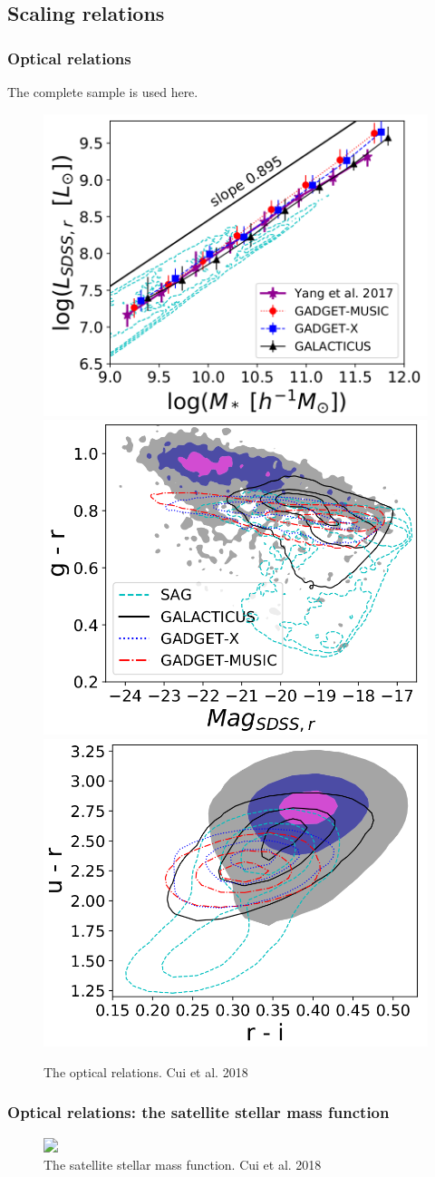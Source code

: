 \documentclass[aspectratio=1610]{beamer}
\begin{document}
\subsection{Scaling relations}
\begin{frame}
  \frametitle{Optical relations}
  The complete sample is used here.
  \begin{figure}
    \includegraphics[width=0.33\linewidth]{Optical-relation1}
    \includegraphics[width=0.32\linewidth]{Optical-relation2}
    \includegraphics[width=0.32\linewidth]{Optical-relation3}
    \vspace{-0.3cm}
    \caption{The optical relations. Cui et al. 2018}
  \end{figure}
\end{frame}
\begin{frame}
  \frametitle{Optical relations: the satellite stellar mass function}
  \begin{figure}
    \includegraphics<1>[width=0.7\linewidth]{Ssmf}
    \vspace{-0.6cm}
    \caption{The satellite stellar mass function. Cui et al. 2018}
  \end{figure}
\end{frame}
\end{document}
